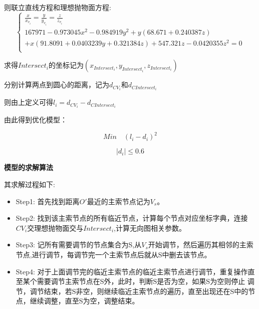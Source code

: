 \documentclass[withoutpreface,bwprint]{cumcmthesis} %
\begin{document}
  则联立直线方程和理想抛物面方程:
  $$\begin{cases}
  \frac{x}{x_{v_i}} = \frac{y}{y_{v_i}}=\frac{z}{z_{v_i}}\\
  167971 - 0.973045 x^2 - 0.984919 y^2 + y (68.671 + 0.240387 z) \\
  + x (91.8091 + 0.0403239 y + 0.321384 z) + 547.321 z - 0.0420355 z^2=0\\
  \end{cases}$$


  求得$Intersect_i$的坐标记为$(x_{Intersect_i},y_{Intersect_i},z_{Intersect_i})$
  
  分别计算两点到圆心的距离，记为$d_{CV_i}$和$d_{CIntersect_i}$
  
  则由上定义可得$l_i=d_{CV_i}-d_{CIntersect_i}$

由此得到优化模型：

\begin{equation*}
    Min \quad (l_i-d_i)^2
\end{equation*}

\begin{equation}
    |d_i|\leq 0.6
\end{equation}
        
\hspace*{\fill}

\hspace*{\fill}



\textbf{模型的求解算法}

其求解过程如下:

\begin{itemize}
    \item Step1: 首先找到距离$O'$最近的主索节点记为$V_s$。
    \item Step2: 找到该主索节点的所有临近节点，计算每个节点对应坐标字典，连接$CV_i$交理想抛物面交与$Intersect_i$,计算无向图相关参数。
    \item Step3: 记所有需要调节的节点集合为S,从$V_s$开始调节，然后遍历其相邻的主索节点,进行调节，每调节完一个主索节点后就从S中删去该节点。
    \item Step4: 对于上面调节完的临近主索节点的临近主索节点进行调节，重复操作直至某个需要调节主索节点在S外，此时，判断S是否为空，如果S为空则停止
    调节，调节结束，若S非空，则继续临近主索节点的遍历，直至出现还在S中的节点，继续调整，直至S为空，调整结束。
\end{itemize}
\end{document}
